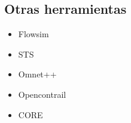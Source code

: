\subsection{Otras herramientas}
\begin{itemize}
	\item Flowsim
	\item STS
	\item Omnet++
	\item Opencontrail
	\item CORE
\end{itemize}

